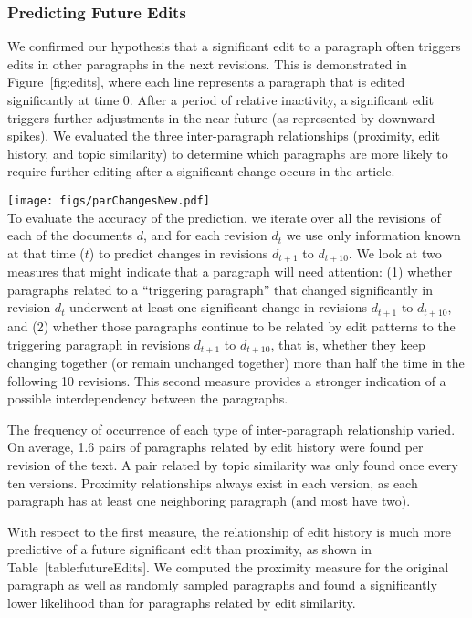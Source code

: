 \subsubsection{Predicting Future Edits}\label{predicting-future-edits-1}

We confirmed our hypothesis that a significant edit to a paragraph often
triggers edits in other paragraphs in the next revisions. This is
demonstrated in Figure~{[}fig:edits{]}, where each line represents a
paragraph that is edited significantly at time 0. After a period of
relative inactivity, a significant edit triggers further adjustments in
the near future (as represented by downward spikes). We evaluated the
three inter-paragraph relationships (proximity, edit history, and topic
similarity) to determine which paragraphs are more likely to require
further editing after a significant change occurs in the article.

\texttt{[image: figs/parChangesNew.pdf]}\\

To evaluate the accuracy of the prediction, we iterate over all the
revisions of each of the documents \(d\), and for each revision \(d_t\)
we use only information known at that time (\(t\)) to predict changes in
revisions \(d_{t+1}\) to \(d_{t+10}\). We look at two measures that
might indicate that a paragraph will need attention: (1) whether
paragraphs related to a ``triggering paragraph'' that changed
significantly in revision \(d_t\) underwent at least one significant
change in revisions \(d_{t+1}\) to \(d_{t+10}\), and (2) whether those
paragraphs continue to be related by edit patterns to the triggering
paragraph in revisions \(d_{t+1}\) to \(d_{t+10}\), that is, whether
they keep changing together (or remain unchanged together) more than
half the time in the following 10 revisions. This second measure
provides a stronger indication of a possible interdependency between the
paragraphs.

The frequency of occurrence of each type of inter-paragraph relationship
varied. On average, 1.6 pairs of paragraphs related by edit history were
found per revision of the text. A pair related by topic similarity was
only found once every ten versions. Proximity relationships always exist
in each version, as each paragraph has at least one neighboring
paragraph (and most have two).

With respect to the first measure, the relationship of edit history is
much more predictive of a future significant edit than proximity, as
shown in Table~{[}table:futureEdits{]}. We computed the proximity
measure for the original paragraph as well as randomly sampled
paragraphs and found a significantly lower likelihood than for
paragraphs related by edit similarity.

